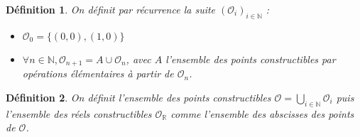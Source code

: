 \documentclass[a4paper,12pt,french]{report}
\newtheorem{definition}{Définition}[section]
\begin{document}
			\begin{definition}
				On définit par récurrence la suite \((\mathcal{O}_i)_{i \in \mathbb{N}} \) :
				\begin{itemize}
					\item \(\mathcal{O}_0 = \{(0, 0), (1, 0)\}\)
					\item \(\forall n \in \mathbb{N}, \mathcal{O}_{n+1} = A\cup \mathcal{O}_{n}\), avec \(A\) l'ensemble des points constructibles par opérations élémentaires à partir de \( \mathcal{O}_{n} \).
				\end{itemize}
			\end{definition}

			\begin{definition}
				On définit l'ensemble des points constructibles \(\mathcal{O} = \bigcup_{i \in \mathbb{N}} \mathcal{O}_i \) puis l'ensemble des réels constructibles \(\mathcal{O}_\mathbb{R}\) comme l'ensemble des abscisses des points de \( \mathcal{O} \).
			\end{definition}
\end{document}
